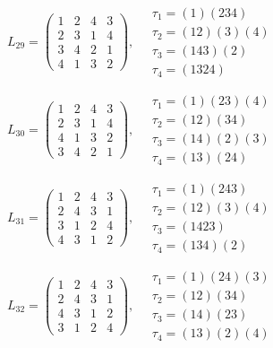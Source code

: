 $L_{29} = \begin{pmatrix} 1 & 2 & 4 & 3 \\ 2 & 3 & 1 & 4 \\ 3 & 4 & 2 & 1 \\ 4 & 1 & 3 & 2 \end{pmatrix}, \quad \begin{matrix} \tau_{1} = (1)(2 3 4) \\ \tau_{2} = (1 2)(3)(4) \\ \tau_{3} = (1 4 3)(2) \\ \tau_{4} = (1 3 2 4) \end{matrix}$

$L_{30} = \begin{pmatrix} 1 & 2 & 4 & 3 \\ 2 & 3 & 1 & 4 \\ 4 & 1 & 3 & 2 \\ 3 & 4 & 2 & 1 \end{pmatrix}, \quad \begin{matrix} \tau_{1} = (1)(2 3)(4) \\ \tau_{2} = (1 2)(3 4) \\ \tau_{3} = (1 4)(2)(3) \\ \tau_{4} = (1 3)(2 4) \end{matrix}$

$L_{31} = \begin{pmatrix} 1 & 2 & 4 & 3 \\ 2 & 4 & 3 & 1 \\ 3 & 1 & 2 & 4 \\ 4 & 3 & 1 & 2 \end{pmatrix}, \quad \begin{matrix} \tau_{1} = (1)(2 4 3) \\ \tau_{2} = (1 2)(3)(4) \\ \tau_{3} = (1 4 2 3) \\ \tau_{4} = (1 3 4)(2) \end{matrix}$

$L_{32} = \begin{pmatrix} 1 & 2 & 4 & 3 \\ 2 & 4 & 3 & 1 \\ 4 & 3 & 1 & 2 \\ 3 & 1 & 2 & 4 \end{pmatrix}, \quad \begin{matrix} \tau_{1} = (1)(2 4)(3) \\ \tau_{2} = (1 2)(3 4) \\ \tau_{3} = (1 4)(2 3) \\ \tau_{4} = (1 3)(2)(4) \end{matrix}$

